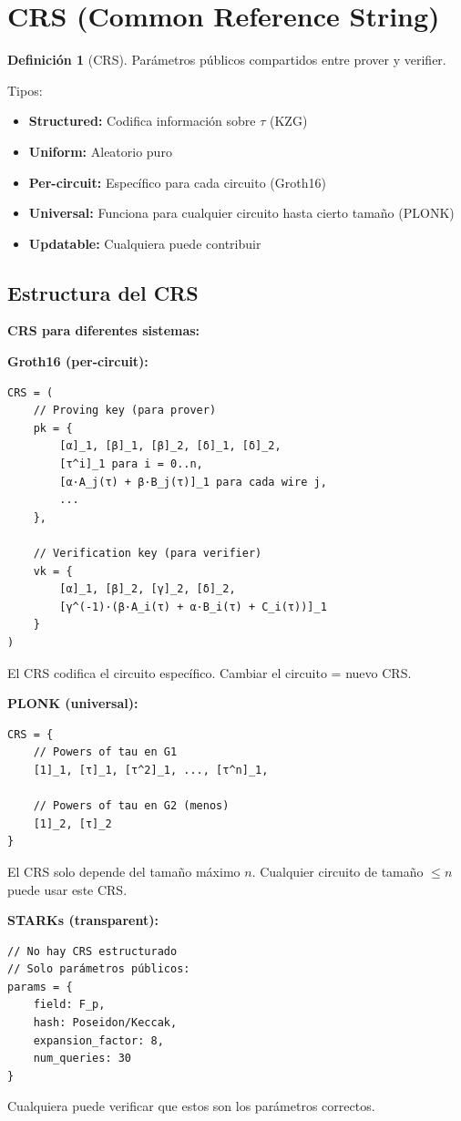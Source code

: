 \documentclass[11pt,a4paper,twoside,openright]{book}
\theoremstyle{definition}
\newtheorem{definition}{Definición}[chapter]
\theoremstyle{plain}
\theoremstyle{remark}
\begin{document}
\section{CRS (Common Reference String)}

\begin{definition}[CRS]
Parámetros públicos compartidos entre prover y verifier.
\end{definition}

Tipos:
\begin{itemize}
    \item \textbf{Structured:} Codifica información sobre $\tau$ (KZG)
    \item \textbf{Uniform:} Aleatorio puro
    \item \textbf{Per-circuit:} Específico para cada circuito (Groth16)
    \item \textbf{Universal:} Funciona para cualquier circuito hasta cierto tamaño (PLONK)
    \item \textbf{Updatable:} Cualquiera puede contribuir
\end{itemize}

\subsection{Estructura del CRS}

\begin{mathnote}
\textbf{CRS para diferentes sistemas:}

\textbf{Groth16 (per-circuit):}
\begin{verbatim}
CRS = (
    // Proving key (para prover)
    pk = {
        [α]_1, [β]_1, [β]_2, [δ]_1, [δ]_2,
        [τ^i]_1 para i = 0..n,
        [α·A_j(τ) + β·B_j(τ)]_1 para cada wire j,
        ...
    },
    
    // Verification key (para verifier)
    vk = {
        [α]_1, [β]_2, [γ]_2, [δ]_2,
        [γ^(-1)·(β·A_i(τ) + α·B_i(τ) + C_i(τ))]_1
    }
)
\end{verbatim}

El CRS codifica el circuito específico. Cambiar el circuito = nuevo CRS.

\textbf{PLONK (universal):}
\begin{verbatim}
CRS = {
    // Powers of tau en G1
    [1]_1, [τ]_1, [τ^2]_1, ..., [τ^n]_1,
    
    // Powers of tau en G2 (menos)
    [1]_2, [τ]_2
}
\end{verbatim}

El CRS solo depende del tamaño máximo $n$. Cualquier circuito de tamaño $\leq n$ puede usar este CRS.

\textbf{STARKs (transparent):}
\begin{verbatim}
// No hay CRS estructurado
// Solo parámetros públicos:
params = {
    field: F_p,
    hash: Poseidon/Keccak,
    expansion_factor: 8,
    num_queries: 30
}
\end{verbatim}

Cualquiera puede verificar que estos son los parámetros correctos.
\end{mathnote}
\end{document}
